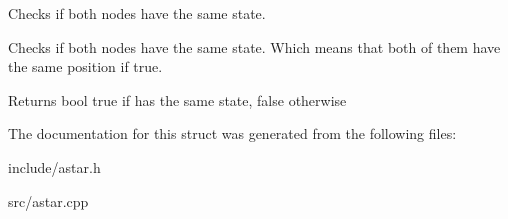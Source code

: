 Checks if both nodes have the same state. 

Checks if both nodes have the same state. Which means that both of them have the same position if true.

\begin{DoxyReturn}{Returns}
bool true if has the same state, false otherwise 
\end{DoxyReturn}


The documentation for this struct was generated from the following files\+:\begin{DoxyCompactItemize}
\item 
include/astar.\+h\item 
src/astar.\+cpp\end{DoxyCompactItemize}
